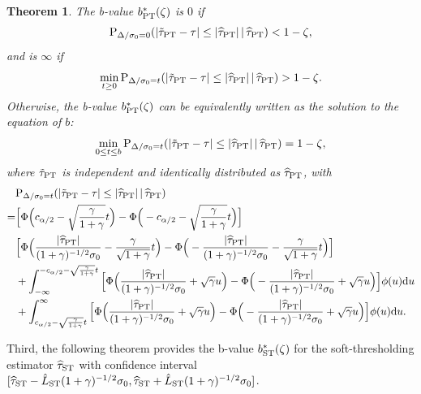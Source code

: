 \documentclass[11pt]{article}
\def\given{\,|\,}
\def\P{{\mathrm P}}
\def\d{{\mathrm d}}
\newcommand{\htau}{\widehat\tau}
\numberwithin{equation}{section}
\newtheorem{theorem}{Theorem}[section]
\theoremstyle{definition}
\begin{document}
\begin{theorem}\label{thm:b_PT}
  The b-value $b^*_{\rm PT}(\zeta)$ is $0$ if
  \[
    \P_{\Delta/\sigma_0 = 0}(\lvert \tilde\tau_{\rm PT} - \tau \rvert \le \lvert \htau_{\rm PT} \rvert \given \htau_{\rm PT}) < 1-\zeta,
  \]
  and is $\infty$ if
  \[
    \min_{t \ge 0}\P_{\Delta/\sigma_0 = t}(\lvert \tilde\tau_{\rm PT} - \tau \rvert \le \lvert \htau_{\rm PT} \rvert \given \htau_{\rm PT}) > 1-\zeta.
  \]
  Otherwise, the b-value $b^*_{\rm PT}(\zeta)$ can be equivalently written as the solution to the equation of $b$:
  \[
    \min_{0 \le t \le b} \P_{\Delta/\sigma_0 = t}(\lvert \tilde\tau_{\rm PT} - \tau \rvert \le \lvert \htau_{\rm PT} \rvert \given \htau_{\rm PT}) = 1-\zeta,
  \]
  where $\tilde\tau_{\rm PT}$ is independent and identically distributed as $\htau_{\rm PT}$, with
  \begin{align*}
    &\P_{\Delta/\sigma_0 = t}(\lvert \tilde\tau_{\rm PT} - \tau \rvert \le \lvert \htau_{\rm PT} \rvert \given \htau_{\rm PT}) \\
    =& \Big[\Phi\Big(c_{\alpha/2} - \sqrt{\frac{\gamma}{1+\gamma}}t \Big) - \Phi\Big(-c_{\alpha/2} - \sqrt{\frac{\gamma}{1+\gamma}}t \Big)\Big]\\
    &\Big[\Phi\Big(\frac{\lvert  \htau_{\rm PT}\rvert}{(1+\gamma)^{-1/2} \sigma_0} - \frac{\gamma}{\sqrt{1+\gamma}} t \Big) - \Phi\Big(-\frac{\lvert  \htau_{\rm PT}\rvert}{(1+\gamma)^{-1/2} \sigma_0}- \frac{\gamma}{\sqrt{1+\gamma}} t\Big)\Big]\\
    &+ \int_{-\infty}^{-c_{\alpha/2} - \sqrt{\frac{\gamma}{1+\gamma}}t} \Big[\Phi\Big(\frac{\lvert  \htau_{\rm PT}\rvert}{(1+\gamma)^{-1/2} \sigma_0} + \sqrt{\gamma} u\Big) - \Phi\Big(-\frac{\lvert  \htau_{\rm PT}\rvert}{(1+\gamma)^{-1/2} \sigma_0} +  \sqrt{\gamma} u\Big)\Big] \phi(u) \d u\\
    &+ \int_{c_{\alpha/2} - \sqrt{\frac{\gamma}{1+\gamma}}t}^\infty \Big[\Phi\Big(\frac{\lvert  \htau_{\rm PT}\rvert}{(1+\gamma)^{-1/2} \sigma_0} + \sqrt{\gamma} u\Big) - \Phi\Big(-\frac{\lvert  \htau_{\rm PT}\rvert}{(1+\gamma)^{-1/2} \sigma_0} + \sqrt{\gamma} u\Big)\Big] \phi(u) \d u.
  \end{align*}
\end{theorem}

Third, the following theorem provides the b-value $b^*_{\rm ST}(\zeta)$ for the soft-thresholding estimator $\htau_{\rm ST}$ with confidence interval $[\htau_{\rm ST}- \hat{L}_{\rm ST} (1+\gamma)^{-1/2} \sigma_0, \htau_{\rm ST}+ \hat{L}_{\rm ST} (1+\gamma)^{-1/2} \sigma_0]$.
\end{document}
